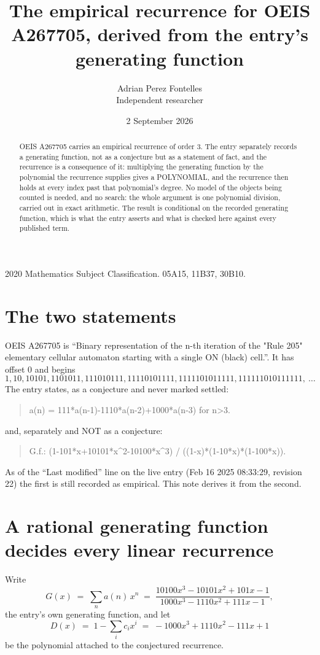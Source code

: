 \documentclass[11pt,a4paper]{article}
\title{The empirical recurrence for OEIS A267705, derived from the entry's generating function}
\author{Adrian Perez Fontelles\\ \small Independent researcher}
\date{2 September 2026}
\theoremstyle{plain}
\theoremstyle{definition}
\begin{document}
\maketitle

\begin{abstract}
OEIS A267705 carries an empirical recurrence of order $3$. The entry separately records a
generating function, not as a conjecture but as a statement of fact, and the recurrence is a
consequence of it: multiplying the generating function by the polynomial the recurrence
supplies gives a POLYNOMIAL, and the recurrence then holds at every index past that
polynomial's degree. No model of the objects being counted is needed, and no search: the
whole argument is one polynomial division, carried out in exact arithmetic. The result is
conditional on the recorded generating function, which is what the entry asserts and what is
checked here against every published term.
\end{abstract}

\noindent\small 2020 Mathematics Subject Classification. 05A15, 11B37, 30B10.\normalsize

\section{The two statements}

OEIS A267705 is ``Binary representation of the n-th iteration of the "Rule 205" elementary cellular automaton starting with a single ON (black) cell.''. It has offset $0$ and begins
\[
1, 10, 10101, 1101011, 111010111, 11110101111, 1111101011111, 111111010111111,\ \dots
\]
The entry states, as a conjecture and never marked settled:
\begin{quote}
a(n) = 111*a(n-1)-1110*a(n-2)+1000*a(n-3) for n>3.
\end{quote}
and, separately and NOT as a conjecture:
\begin{quote}
G.f.: (1-101*x+10101*x\^{}2-10100*x\^{}3) / ((1-x)*(1-10*x)*(1-100*x)).
\end{quote}
As of the ``Last modified'' line on the live entry (Feb 16 2025 08:33:29, revision 22) the first is still
recorded as empirical. This note derives it from the second.

\section{A rational generating function decides every linear recurrence}

Write
\[
G(x)\;=\;\sum_{n}a(n)\,x^{n}\;=\;\frac{10100 x^{3} - 10101 x^{2} + 101 x - 1}{1000 x^{3} - 1110 x^{2} + 111 x - 1},
\]
the entry's own generating function, and let
\[
D(x)\;=\;1-\sum_i c_i x^{i}\;=\;- 1000 x^{3} + 1110 x^{2} - 111 x + 1
\]
be the polynomial attached to the conjectured recurrence.
\end{document}

